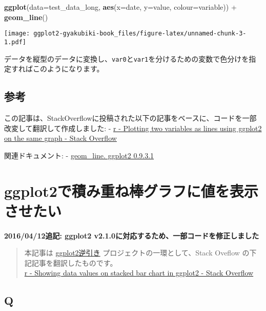 \documentclass[]{book}
\newenvironment{Shaded}{\begin{snugshade}}{\end{snugshade}}
\newcommand{\KeywordTok}[1]{\textcolor[rgb]{0.13,0.29,0.53}{\textbf{{#1}}}}
\newcommand{\DataTypeTok}[1]{\textcolor[rgb]{0.13,0.29,0.53}{{#1}}}
\newcommand{\StringTok}[1]{\textcolor[rgb]{0.31,0.60,0.02}{{#1}}}
\newcommand{\NormalTok}[1]{{#1}}
\begin{document}
\begin{Shaded}
\begin{Highlighting}[]
\KeywordTok{ggplot}\NormalTok{(}\DataTypeTok{data=}\NormalTok{test_data_long, }\KeywordTok{aes}\NormalTok{(}\DataTypeTok{x=}\NormalTok{date, }\DataTypeTok{y=}\NormalTok{value, }\DataTypeTok{colour=}\NormalTok{variable)) +}
\StringTok{  }\KeywordTok{geom_line}\NormalTok{()}
\end{Highlighting}
\end{Shaded}

\texttt{[image: ggplot2-gyakubiki-book\_files/figure-latex/unnamed-chunk-3-1.pdf]}

データを縦型のデータに変換し、\texttt{var0}と\texttt{var1}を分けるための変数で色分けを指定すればこのようになります。

\section{参考}

この記事は、StackOverflowに投稿された以下の記事をベースに、コードを一部改変して翻訳して作成しました:
-
\href{http://stackoverflow.com/questions/3777174/plotting-two-variables-as-lines-using-ggplot2-on-the-same-graph}{r
- Plotting two variables as lines using ggplot2 on the same graph -
Stack Overflow}

関連ドキュメント: -
\href{http://docs.ggplot2.org/current/geom_line.html}{geom\_line.
ggplot2 0.9.3.1}

\chapter{ggplot2で積み重ね棒グラフに値を表示させたい}\label{ggplot2}

\textbf{2016/04/12追記: ggplot2
v2.1.0に対応するため、一部コードを修正しました}

\begin{quote}
本記事は
\href{http://qiita.com/tags/ggplot2\%E9\%80\%86\%E5\%BC\%95\%E3\%81\%8D/items}{ggplot2逆引き}
プロジェクトの一環として、Stack Oveflow の下記記事を翻訳したものです。\\
\href{http://stackoverflow.com/questions/6644997/showing-data-values-on-stacked-bar-chart-in-ggplot2}{r
- Showing data values on stacked bar chart in ggplot2 - Stack Overflow}
\end{quote}

\section{Q}\label{q-1}
\end{document}
